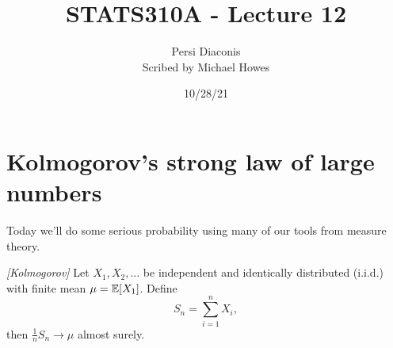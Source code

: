 




\title{STATS310A - Lecture 12}
\author{Persi Diaconis\\ Scribed by Michael Howes}
\date{10/28/21}

\pagestyle{fancy}
\fancyhf{}


\maketitle
\tableofcontents
\section{Kolmogorov's strong law of large numbers}
Today we'll do some serious probability using many of our tools from measure theory.
\begin{thrm}
    \emph{[Kolmogorov]} Let $X_1,X_2,\ldots$ be independent and identically distributed (i.i.d.) with finite mean $\mu = {\mathbb{E}}[X_1]$. Define 
    \[S_n = \sum_{i=1}^n X_i, \]
    then $\frac{1}{n}S_n \to \mu$ almost surely.
\end{thrm}
